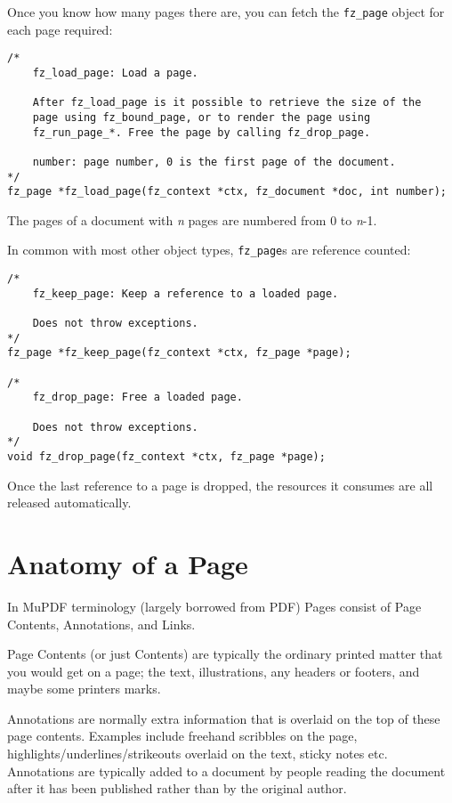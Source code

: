 \documentclass[oneside]{book}
\begin{document}
Once you know how many pages there are, you can fetch the \texttt{fz\_page} object for each page required:

\begin{lstlisting}
/*
	fz_load_page: Load a page.

	After fz_load_page is it possible to retrieve the size of the
	page using fz_bound_page, or to render the page using
	fz_run_page_*. Free the page by calling fz_drop_page.

	number: page number, 0 is the first page of the document.
*/
fz_page *fz_load_page(fz_context *ctx, fz_document *doc, int number);
\end{lstlisting}

The pages of a document with \textit{n} pages are numbered from 0 to \textit{n}-1.

In common with most other object types, \texttt{fz\_page}s are reference counted:

\begin{lstlisting}
/*
	fz_keep_page: Keep a reference to a loaded page.

	Does not throw exceptions.
*/
fz_page *fz_keep_page(fz_context *ctx, fz_page *page);

/*
	fz_drop_page: Free a loaded page.

	Does not throw exceptions.
*/
void fz_drop_page(fz_context *ctx, fz_page *page);
\end{lstlisting}

Once the last reference to a page is dropped, the resources it consumes are all released automatically.


\section{Anatomy of a Page}

In MuPDF terminology (largely borrowed from PDF) Pages consist of Page Contents, Annotations, and Links.

Page Contents (or just Contents) are typically the ordinary printed matter that you would get on a page; the text, illustrations, any headers or footers, and maybe some printers marks.

Annotations are normally extra information that is overlaid on the top of these page contents. Examples include freehand scribbles on the page, highlights\slash underlines\slash strikeouts overlaid on the text, sticky notes etc. Annotations are typically added to a document by people reading the document after it has been published rather than by the original author.
\end{document}
